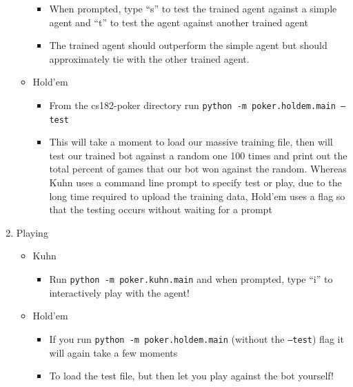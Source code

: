 \documentclass[11pt]{article}
\begin{document}
\begin{enumerate}
\begin{itemize}
\begin{itemize}
            \item When prompted, type ``s'' to test the trained agent against a simple agent and ``t'' to test the agent against another trained agent
            \item The trained agent should outperform the simple agent but should approximately tie with the other trained agent.
      	\end{itemize}
        \item Hold'em
        \begin{itemize}
        	\item From the cs182-poker directory run \texttt{python -m poker.holdem.main -- test}
            \item This will take a moment to load our massive training file, then will test our trained bot against a random one 100 times and print out the total percent of games that our bot won against the random. Whereas Kuhn uses a command line prompt to specify test or play, due to the long time required to upload the training data, Hold'em uses a flag so that the testing occurs without waiting for a prompt
        \end{itemize}
    \end{itemize}
\item Playing
	\begin{itemize}
    	\item Kuhn
        \begin{itemize}
        	\item Run \texttt{python -m poker.kuhn.main} and when prompted, type ``i'' to interactively play with the agent!
        \end{itemize}
    	\item Hold'em
        	\begin{itemize}
            	\item If you run \texttt{python -m poker.holdem.main} (without the \texttt{--test}) flag it will again take a few moments 
                \item To load the test file, but then let you play against the bot yourself!
            \end{itemize}  
    \end{itemize}
\end{enumerate}
\end{document}
